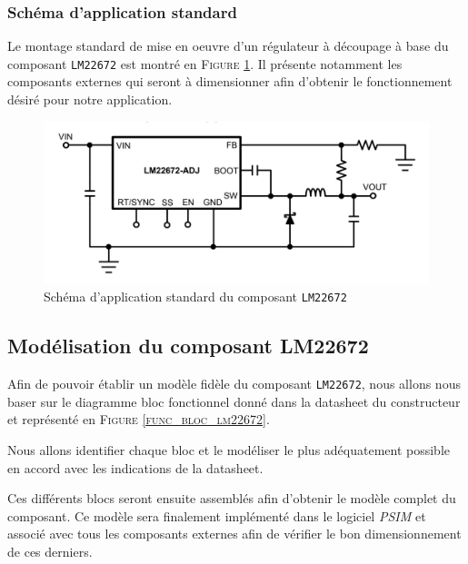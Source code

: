 			\subsubsection{Schéma d'application standard}
				
			Le montage standard de mise en oeuvre d'un régulateur à découpage
			à base du composant \texttt{LM22672} est montré en 
			\textsc{Figure \ref{buck_gen_scheme}}. Il présente notamment les
			composants externes qui seront à dimensionner afin d'obtenir le
			fonctionnement désiré pour notre application.
			
			\begin{figure}[h]
				\begin{center}
					\includegraphics[scale=0.5]{../Illus/buck_gen_scheme.png}
				\end{center}
				\caption{Schéma d'application standard du composant \texttt{LM22672}}
				\label{buck_gen_scheme}
			\end{figure}
				
		\subsection{Modélisation du composant LM22672}
			
		Afin de pouvoir établir un modèle fidèle du composant 
		\texttt{LM22672}, nous allons nous baser sur le diagramme bloc
		fonctionnel donné dans la datasheet du constructeur 
		\cite{LM22672} et représenté en
		\textsc{Figure \ref{func_bloc_lm22672}}. 
		
		Nous allons identifier chaque bloc et le modéliser le plus 
		adéquatement possible en accord avec les indications de la datasheet. 
		
		Ces différents blocs seront ensuite assemblés afin d'obtenir le modèle 
		complet du composant. Ce modèle sera finalement implémenté dans le 
		logiciel \textit{PSIM} et associé avec tous les composants externes 
		afin de vérifier le bon dimensionnement de ces derniers.
								
